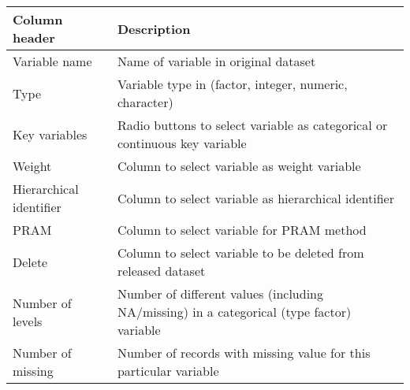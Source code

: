 \documentclass[letterpaper,10pt,english]{sphinxmanual}
\begin{document}
\begin{savenotes}\sphinxattablestart
\centering
{}
\label{\detokenize{setup:tabsetup1}}\label{\detokenize{setup:id2}}
\sphinxaftercaption
\begin{tabulary}{\linewidth}[t]{|T|T|}
\hline
\sphinxstyletheadfamily 
Column header
&\sphinxstyletheadfamily 
Description
\\
\hline
Variable name
&
Name of variable in original dataset
\\
\hline
Type
&
Variable type in  (factor, integer, numeric, character)
\\
\hline
Key variables
&
Radio buttons to select variable as categorical or continuous key variable
\\
\hline
Weight
&
Column to select variable as weight variable
\\
\hline
Hierarchical identifier
&
Column to select variable as hierarchical identifier
\\
\hline
PRAM
&
Column to select variable for PRAM method
\\
\hline
Delete
&
Column to select variable to be deleted from released dataset
\\
\hline
Number of levels
&
Number of different values (including NA/missing) in a categorical (type factor) variable
\\
\hline
Number of missing
&
Number of records with missing value for this particular variable
\\
\hline
\end{tabulary}
\par
\sphinxattableend\end{savenotes}
\end{document}
